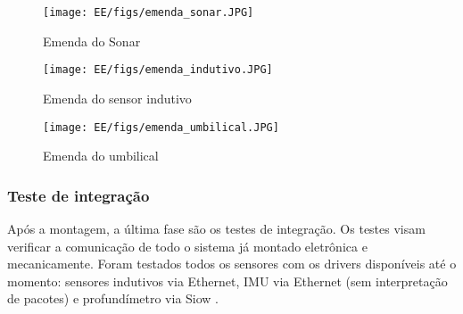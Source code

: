  \begin{figure}[H]
 \centering
 \texttt{[image: EE/figs/emenda\_sonar.JPG]}
 \caption{Emenda do Sonar}
 \label{fig:emenda_sonar}
 \end{figure}
 
  \begin{figure}[H]
 \centering
 \texttt{[image: EE/figs/emenda\_indutivo.JPG]}
 \caption{Emenda do sensor indutivo}
 \label{fig:emenda_indutivo}
 \end{figure}
 
  \begin{figure}[H]
 \centering
 \texttt{[image: EE/figs/emenda\_umbilical.JPG]}
 \caption{Emenda do umbilical}
 \label{fig:emenda_umbilical}
 \end{figure}

\subsubsection{Teste de integração}
Após a montagem, a última fase são os testes de integração. Os testes visam
verificar a comunicação de todo o sistema já montado eletrônica e mecanicamente.
Foram testados todos os sensores com os drivers disponíveis até o momento:
sensores indutivos via Ethernet, IMU via Ethernet (sem interpretação de
pacotes) e profundímetro via Siow .

\label{metodos}


